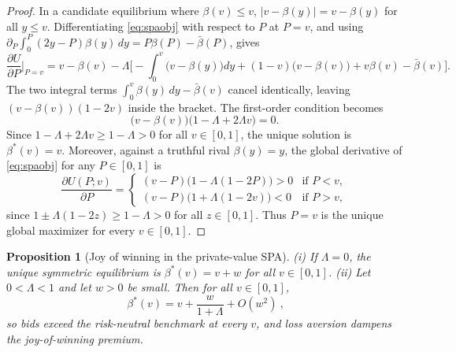 \documentclass[11pt,a4paper]{article}
\newtheorem{proposition}{Proposition}
\theoremstyle{remark}
\begin{document}
\begin{proof}
In a candidate equilibrium where $\beta(v)\le v$, $|v-\beta(y)|=v-\beta(y)$ for all
$y\le v$. Differentiating \eqref{eq:spaobj} with respect to $P$ at $P=v$, and using
$\partial_P\int_0^P(2y-P)\beta(y)\,dy=P\beta(P)-\bar\beta(P)$, gives
\begin{equation}
\frac{\partial U}{\partial P}\Big|_{P=v}
=v-\beta(v)-\Lambda\Big[-\!\int_0^v\!\big(v-\beta(y)\big)dy+(1-v)\big(v-\beta(v)\big)
+v\beta(v)-\bar\beta(v)\Big].
\end{equation}
The two integral terms $\int_0^v\beta(y)\,dy-\bar\beta(v)$ cancel identically,
leaving $(v-\beta(v))(1-2v)$ inside the bracket. The first-order condition becomes
\begin{equation}
\big(v-\beta(v)\big)\big(1-\Lambda+2\Lambda v\big)=0 .
\end{equation}
Since $1-\Lambda+2\Lambda v\ge 1-\Lambda>0$ for all $v\in[0,1]$, the unique solution
is $\beta^*(v)=v$. Moreover, against a truthful rival $\beta(y)=y$, the global
derivative of \eqref{eq:spaobj} for any $P\in[0,1]$ is
\begin{equation}
\frac{\partial U(P;v)}{\partial P}
=\begin{cases}
(v-P)\big(1-\Lambda(1-2P)\big) > 0 & \text{if } P < v, \\
(v-P)\big(1+\Lambda(1-2v)\big) < 0 & \text{if } P > v,
\end{cases}
\end{equation}
since $1\pm\Lambda(1-2z)\ge 1-\Lambda>0$ for all $z\in[0,1]$. Thus $P=v$ is the
unique global maximizer for every $v\in[0,1]$.
\end{proof}

\begin{proposition}[Joy of winning in the private-value SPA]
\label{prop:spa}
(i) If $\Lambda=0$, the unique symmetric equilibrium is $\beta^{*}(v)=v+w$ for all
$v\in[0,1]$. (ii) Let $0<\Lambda<1$ and let $w>0$ be small. Then for all $v\in[0,1]$,
\begin{equation}
\boxed{\ \beta^{*}(v)=v+\frac{w}{1+\Lambda}+O(w^{2})\ },
\end{equation}
so bids exceed the risk-neutral benchmark at every $v$, and loss aversion
\emph{dampens} the joy-of-winning premium.
\end{proposition}
\end{document}
